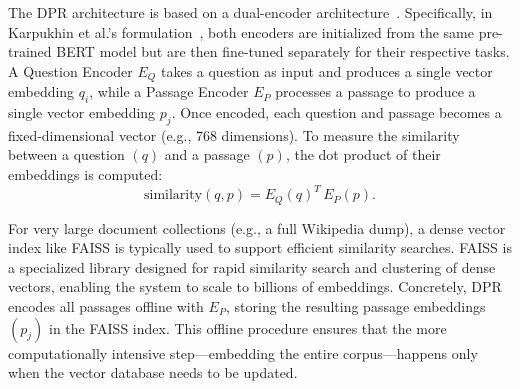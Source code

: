 The DPR architecture is based on a dual-encoder architecture~\cite{dualencoderarchitecture}. Specifically, in Karpukhin et al.'s formulation~\cite{densepassageretrievalopendomainkarpukhin2020}, both encoders are initialized from the same pre-trained BERT model but are then fine-tuned separately for their respective tasks. A Question Encoder \(E_Q\) takes a question as input and produces a single vector embedding \(q_i\), while a Passage Encoder \(E_P\) processes a passage to produce a single vector embedding \(p_j\). Once encoded, each question and passage becomes a fixed-dimensional vector (e.g., 768 dimensions). To measure the similarity between a question \((q)\) and a passage \((p)\), the dot product of their embeddings is computed:
\begin{equation}
    \label{eq:dot_sim}
    \text{similarity}(q, p) = E_Q(q)^T \, E_P(p).
\end{equation}

For very large document collections (e.g., a full Wikipedia dump), a dense vector index like \ac{FAISS} \cite{DOUZE2024FAISS} is typically used to support efficient similarity searches. \ac{FAISS} is a specialized library designed for rapid similarity search and clustering of dense vectors, enabling the system to scale to billions of embeddings. Concretely, DPR encodes all passages offline with \(E_P\), storing the resulting passage embeddings \((p_j)\) in the \ac{FAISS} index. This offline procedure ensures that the more computationally intensive step—embedding the entire corpus—happens only when the vector database needs to be updated.



